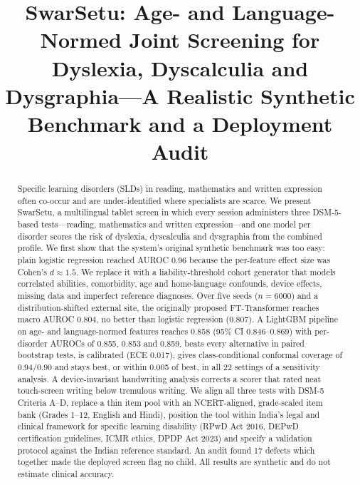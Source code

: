 \documentclass[conference]{IEEEtran}
\begin{document}
\title{SwarSetu: Age- and Language-Normed Joint Screening for Dyslexia, Dyscalculia and Dysgraphia---A Realistic Synthetic Benchmark and a Deployment Audit}

\author{
}

\maketitle

\begin{abstract}
Specific learning disorders (SLDs) in reading, mathematics and written expression often co-occur and are under-identified where specialists are scarce. We present SwarSetu, a multilingual tablet screen in which every session administers three DSM-5-based tests---reading, mathematics and written expression---and one model per disorder scores the risk of dyslexia, dyscalculia and dysgraphia from the combined profile. We first show that the system's original synthetic benchmark was too easy: plain logistic regression reached AUROC 0.96 because the per-feature effect size was Cohen's $d\approx1.5$. We replace it with a liability-threshold cohort generator that models correlated abilities, comorbidity, age and home-language confounds, device effects, missing data and imperfect reference diagnoses. Over five seeds ($n{=}6000$) and a distribution-shifted external site, the originally proposed FT-Transformer reaches macro AUROC 0.804, no better than logistic regression (0.807). A LightGBM pipeline on age- and language-normed features reaches 0.858 (95\% CI 0.846--0.869) with per-disorder AUROCs of 0.855, 0.853 and 0.859, beats every alternative in paired bootstrap tests, is calibrated (ECE 0.017), gives class-conditional conformal coverage of 0.94/0.90 and stays best, or within 0.005 of best, in all 22 settings of a sensitivity analysis. A device-invariant handwriting analysis corrects a scorer that rated neat touch-screen writing below tremulous writing. We align all three tests with DSM-5 Criteria A--D, replace a thin item pool with an NCERT-aligned, grade-scaled item bank (Grades 1--12, English and Hindi), position the tool within India's legal and clinical framework for specific learning disability (RPwD Act 2016, DEPwD certification guidelines, ICMR ethics, DPDP Act 2023) and specify a validation protocol against the Indian reference standard. An audit found 17 defects which together made the deployed screen flag no child. All results are synthetic and do not estimate clinical accuracy.
\end{abstract}
\end{document}
